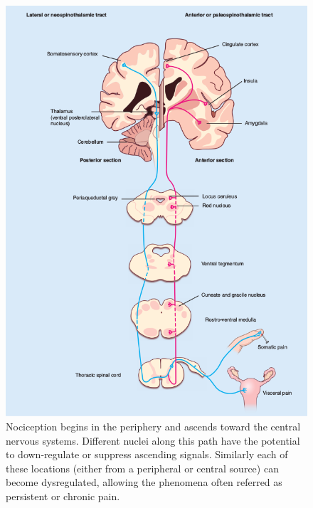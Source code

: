  \begin{figure}
 	\centering\includegraphics[width=1 \textwidth]{figures/PNG/Fenton2015.png}
 \caption{Nociception begins in the periphery and ascends toward the central nervous systems.
 Different nuclei along this path have the potential to down-regulate or suppress ascending signals. Similarly each of these locations (either from a peripheral or central source) can become dysregulated, allowing the phenomena often referred as persistent or chronic pain. \citep[300]{fenton2015neurobiology}}
 \label{fig:painperception}
 \end{figure}




